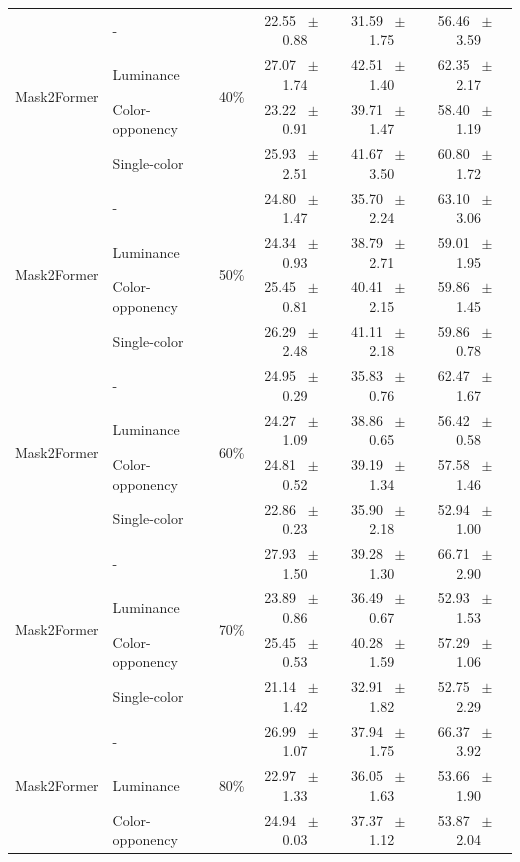 \begin{table}[h]
\begin{tabular}{@{}l l c c c c@{}}
    \multirow{4}{*}{Mask2Former} & - & \multirow{4}{*}{40\%} & 22.55 ~$\pm$~ 0.88 & 31.59 ~$\pm$~ 1.75 & 56.46 ~$\pm$~ 3.59 \\
    & Luminance &  & 27.07 ~$\pm$~ 1.74 & 42.51 ~$\pm$~ 1.40 & 62.35 ~$\pm$~ 2.17 \\
    & Color-opponency &  & 23.22 ~$\pm$~ 0.91 & 39.71 ~$\pm$~ 1.47 & 58.40 ~$\pm$~ 1.19 \\
    & Single-color &  & 25.93 ~$\pm$~ 2.51 & 41.67 ~$\pm$~ 3.50 & 60.80 ~$\pm$~ 1.72 \\
    \midrule
    \multirow{4}{*}{Mask2Former} & - & \multirow{4}{*}{50\%} & 24.80 ~$\pm$~ 1.47 & 35.70 ~$\pm$~ 2.24 & 63.10 ~$\pm$~ 3.06 \\
    & Luminance &  & 24.34 ~$\pm$~ 0.93 & 38.79 ~$\pm$~ 2.71 & 59.01 ~$\pm$~ 1.95 \\
    & Color-opponency &  & 25.45 ~$\pm$~ 0.81 & 40.41 ~$\pm$~ 2.15 & 59.86 ~$\pm$~ 1.45 \\
    & Single-color &  & 26.29 ~$\pm$~ 2.48 & 41.11 ~$\pm$~ 2.18 & 59.86 ~$\pm$~ 0.78 \\
    \midrule
    \multirow{4}{*}{Mask2Former} & - & \multirow{4}{*}{60\%} & 24.95 ~$\pm$~ 0.29 & 35.83 ~$\pm$~ 0.76 & 62.47 ~$\pm$~ 1.67 \\
    & Luminance &  & 24.27 ~$\pm$~ 1.09 & 38.86 ~$\pm$~ 0.65 & 56.42 ~$\pm$~ 0.58 \\
    & Color-opponency &  & 24.81 ~$\pm$~ 0.52 & 39.19 ~$\pm$~ 1.34 & 57.58 ~$\pm$~ 1.46 \\
    & Single-color &  & 22.86 ~$\pm$~ 0.23 & 35.90 ~$\pm$~ 2.18 & 52.94 ~$\pm$~ 1.00 \\
    \midrule
    \multirow{4}{*}{Mask2Former} & - & \multirow{4}{*}{70\%} & 27.93 ~$\pm$~ 1.50 & 39.28 ~$\pm$~ 1.30 & 66.71 ~$\pm$~ 2.90 \\
    & Luminance &  & 23.89 ~$\pm$~ 0.86 & 36.49 ~$\pm$~ 0.67 & 52.93 ~$\pm$~ 1.53 \\
    & Color-opponency &  & 25.45 ~$\pm$~ 0.53 & 40.28 ~$\pm$~ 1.59 & 57.29 ~$\pm$~ 1.06 \\
    & Single-color &  & 21.14 ~$\pm$~ 1.42 & 32.91 ~$\pm$~ 1.82 & 52.75 ~$\pm$~ 2.29 \\
    \midrule
    \multirow{4}{*}{Mask2Former} & - & \multirow{4}{*}{80\%} & 26.99 ~$\pm$~ 1.07 & 37.94 ~$\pm$~ 1.75 & 66.37 ~$\pm$~ 3.92 \\
    & Luminance &  & 22.97 ~$\pm$~ 1.33 & 36.05 ~$\pm$~ 1.63 & 53.66 ~$\pm$~ 1.90 \\
    & Color-opponency &  & 24.94 ~$\pm$~ 0.03 & 37.37 ~$\pm$~ 1.12 & 53.87 ~$\pm$~ 2.04 \\

\end{tabular}
\end{table}
